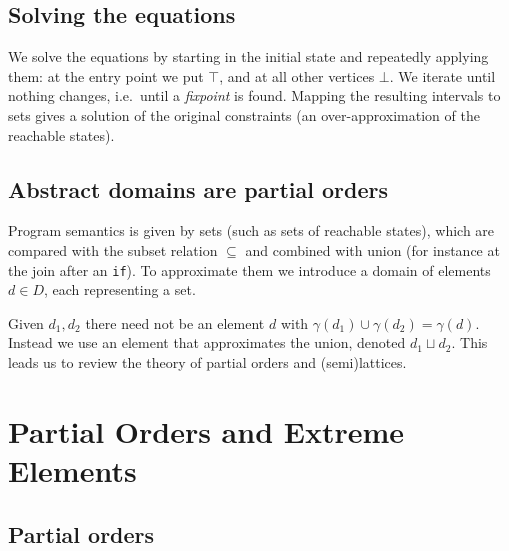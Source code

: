 \subsection*{Solving the equations}
 
We solve the equations by starting in the initial state and repeatedly applying them: at the entry point we put $\top$, and at all other vertices $\bot$. We iterate until nothing changes, i.e.\ until a \emph{fixpoint} is found. Mapping the resulting intervals to sets gives a solution of the original constraints (an over-approximation of the reachable states).
 
\subsection*{Abstract domains are partial orders}
 
Program semantics is given by sets (such as sets of reachable states), which are compared with the subset relation $\subseteq$ and combined with union (for instance at the join after an \texttt{if}). To approximate them we introduce a domain of elements $d \in D$, each representing a set.
 
 
Given $d_1, d_2$ there need not be an element $d$ with $\gamma(d_1) \cup \gamma(d_2) = \gamma(d)$. Instead we use an element that approximates the union, denoted $d_1 \sqcup d_2$. This leads us to review the theory of partial orders and (semi)lattices.
 
\section{Partial Orders and Extreme Elements}
 
\subsection*{Partial orders}
 
 
